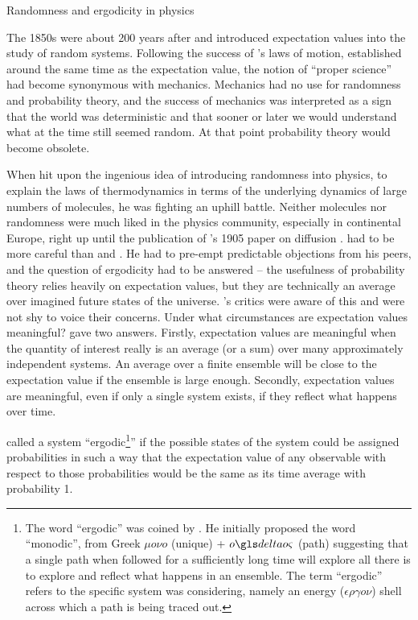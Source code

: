 \begin{history}{Randomness and ergodicity in physics}

The 1850s were about 200 years after  and  introduced expectation 
values into the study of random systems. Following the success of 's 
laws of motion, established around the same time as the expectation value, 
the notion of ``proper science'' had become synonymous with 
mechanics. Mechanics had no use for randomness and probability 
theory, and the success of mechanics was interpreted as a sign that 
the world was deterministic and that sooner or later we would understand 
what at the time still seemed random. At that point probability theory would 
become obsolete. 

When  hit upon the ingenious idea of introducing randomness into 
physics, to explain the laws of thermodynamics in terms of the underlying 
dynamics of large numbers of molecules, he was fighting an uphill battle. 
Neither molecules nor randomness were much liked in the physics 
community, especially in continental Europe, right up until the publication of 
's 1905 paper on diffusion \cite{Einstein1905}.  had to be 
more careful than  and . He had to pre-empt
predictable objections from his peers, and the question of ergodicity had to be 
answered -- the usefulness of probability theory relies heavily on expectation 
values, but they are technically an average over imagined future states of the 
universe. 's critics were aware of this and were not shy to voice their
concerns. Under what circumstances are expectation values meaningful? 
 gave two answers. Firstly, expectation values are meaningful when 
the quantity of interest really is an average (or a sum) over many approximately 
independent systems. An average over a finite ensemble will be close to the 
expectation value if the ensemble is large enough. Secondly, expectation values 
are meaningful, even if only a single system exists, if they reflect what happens over time. 

 called a system ``ergodic\footnote{The word ``ergodic'' was coined by . 
He initially proposed the word ``monodic'', from Greek $\mu o \nu o$ (unique) + $o\d o \varsigma$ (path) suggesting 
that a single path when followed for a sufficiently long time will explore all there is to explore and reflect what happens 
in an ensemble. The term ``ergodic'' refers to the specific system  was considering, namely an energy 
($\epsilon \rho \gamma o \nu$) shell across which a path is being traced out.}'' if the possible 
states of the system could be assigned probabilities in such a way that
the expectation value of any observable with respect to those probabilities would 
be the same as its time average with probability 1.
\end{history}

